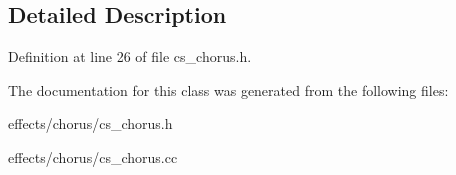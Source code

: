 \subsection{Detailed Description}


Definition at line 26 of file cs\+\_\+chorus.\+h.



The documentation for this class was generated from the following files\+:\begin{DoxyCompactItemize}
\item 
effects/chorus/cs\+\_\+chorus.\+h\item 
effects/chorus/cs\+\_\+chorus.\+cc\end{DoxyCompactItemize}
